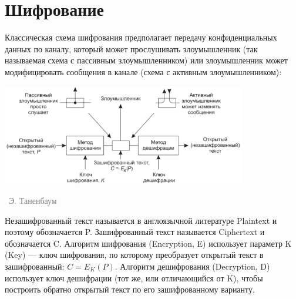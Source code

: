 \documentclass[a5paper]{article}
\newcommand{\attribution}[1] {
\vspace{-5mm}\begin{flushright}\begin{scriptsize}\textcolor{gray}{\textcopyright\, #1}\end{scriptsize}\end{flushright}
}
\begin{document}
\section{Шифрование}

Классическая схема шифрования предполагает передачу конфиденциальных данных по каналу, который может прослушивать злоумышленник (так называемая схема с пассивным злоумышленником) или злоумышленник может модифицировать сообщения в канале (схема с активным злоумышленником):

\begin{center}
    \includegraphics[width=0.8\textwidth]{cryptography.png}
    \attribution{Э. Таненбаум}
\end{center}

Незашифрованный текст называется в англоязычной литературе Plaintext и поэтому обозначается P. Зашифрованный текст называется Ciphertext и обозначается C. Алгоритм шифрования (Encryption, E) использует параметр K (Key) --- ключ шифрования, по которому преобразует открытый текст в зашифрованный: $C = E_K(P)$. Алгоритм дешифрования (Decryption, D) использует ключ дешифрации (тот же, или отличающийся от K), чтобы построить обратно открытый текст по его зашифрованному варианту.
\end{document}
